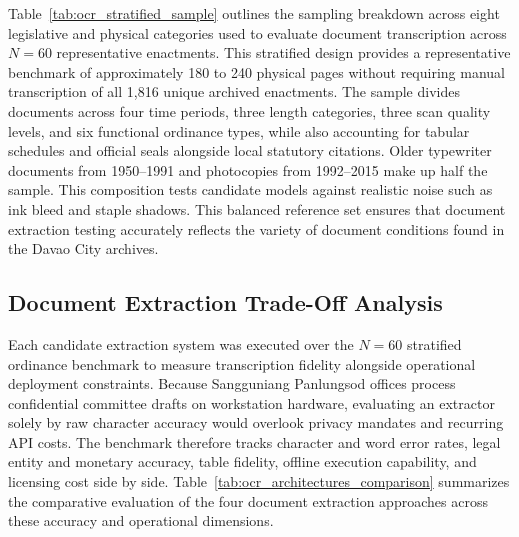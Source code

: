 Table~\ref{tab:ocr_stratified_sample} outlines the sampling breakdown across eight legislative and physical categories used to evaluate document transcription across $N = 60$ representative enactments. This stratified design provides a representative benchmark of approximately 180 to 240 physical pages without requiring manual transcription of all 1,816 unique archived enactments. The sample divides documents across four time periods, three length categories, three scan quality levels, and six functional ordinance types, while also accounting for tabular schedules and official seals alongside local statutory citations. Older typewriter documents from 1950--1991 and photocopies from 1992--2015 make up half the sample. This composition tests candidate models against realistic noise such as ink bleed and staple shadows. This balanced reference set ensures that document extraction testing accurately reflects the variety of document conditions found in the Davao City archives.


\subsection{Document Extraction Trade-Off Analysis}
Each candidate extraction system was executed over the $N = 60$ stratified ordinance benchmark to measure transcription fidelity alongside operational deployment constraints. Because Sangguniang Panlungsod offices process confidential committee drafts on workstation hardware, evaluating an extractor solely by raw character accuracy would overlook privacy mandates and recurring API costs. The benchmark therefore tracks character and word error rates, legal entity and monetary accuracy, table fidelity, offline execution capability, and licensing cost side by side. Table~\ref{tab:ocr_architectures_comparison} summarizes the comparative evaluation of the four document extraction approaches across these accuracy and operational dimensions.

